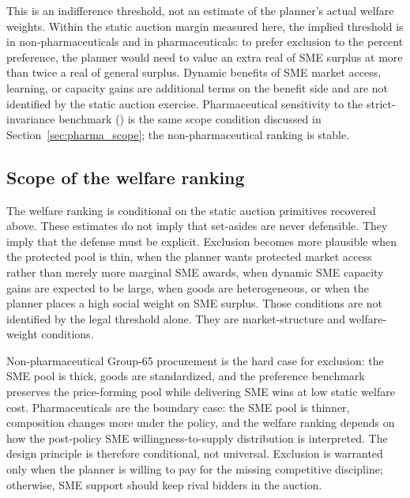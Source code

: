 This is an indifference threshold, not an estimate of the planner's actual
welfare weights. Within the static auction margin measured here, the
implied threshold is \welfWeightMainNp{} in non-pharmaceuticals and
\welfWeightMainPh{} in pharmaceuticals: to prefer exclusion to the \prefMainPct{}
percent preference, the planner would need to value an extra real of SME
surplus at more than twice a real of general surplus. Dynamic benefits of
SME market access, learning, or capacity gains are additional terms on the
benefit side and are not identified by the static auction exercise.
Pharmaceutical sensitivity to the strict-invariance benchmark
(\welfWeightSiPh{}) is the same scope condition discussed in
Section~\ref{sec:pharma_scope}; the non-pharmaceutical ranking is stable.

\subsection{Scope of the welfare ranking}

The welfare ranking is conditional on the static auction primitives
recovered above. These estimates do not imply that set-asides are never
defensible. They imply that the defense must be explicit. Exclusion becomes
more plausible when the protected pool is thin, when the planner wants
protected market access rather than merely more marginal SME awards, when
dynamic SME capacity gains are expected to be large, when goods are
heterogeneous, or when the planner places a high social weight on SME
surplus. Those conditions are not identified by the legal threshold alone.
They are market-structure and welfare-weight conditions.

Non-pharmaceutical Group-65 procurement is the hard case for exclusion: the
SME pool is thick, goods are standardized, and the preference benchmark
preserves the price-forming pool while delivering SME wins at low static
welfare cost. Pharmaceuticals are the boundary case: the SME pool is
thinner, composition changes more under the policy, and the welfare ranking
depends on how the post-policy SME willingness-to-supply distribution is
interpreted. The design principle is therefore conditional, not universal. Exclusion
is warranted only when the planner is willing to pay for the missing
competitive discipline; otherwise, SME support should keep rival bidders
in the auction.
